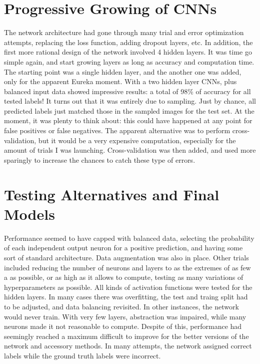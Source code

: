 \documentclass{article}
\begin{document}
\section{Progressive Growing of CNNs}
The network architecture had gone through many trial and error optimization attempts, replacing the loss function, adding dropout layers, etc.
In addition, the first more rational design of the network involved 4 hidden layers.
It was time go simple again, and start growing layers as long as accuracy and computation time.
The starting point was a single hidden layer, and the another one was added, only for the apparent Eureka moment.
With a two hidden layer CNNs, plus balanced input data showed impressive results: a total of 98\% of accuracy for all tested labels!
It turns out that it was entirely due to sampling.
Just by chance, all predicted labels just matched those in the sampled images for the test set.
At the moment, it was plenty to think about: this could have happened at any point for false positives or false negatives.
The apparent alternative was to perform cross-validation, but it would be a very expensive computation, especially for the amount of trials I was launching.
Cross-validation was then added, and used more sparingly to increase the chances to catch these type of errors.


\section{Testing Alternatives and Final Models}
Performance seemed to have capped with balanced data, selecting the probability of each independent output neuron for a positive prediction, and having some sort of standard architecture.
Data augmentation was also in place.
Other trials included reducing the number of neurons and layers to as the extremes of as few a as possible, or as high as it allows to compute, testing as many variations of hyperparameters as possible.
All kinds of activation functions were tested for the hidden layers.
In many cases there was overfitting, the test and traing split had to be adjusted, and data balancing revisited.
In other instances, the network would never train.
With very few layers, abstraction was impaired, while many neurons made it not reasonable to compute.
Despite of this, performance had seemingly reached a maximum difficult to improve for the better versions of the network and accessory methods.
In many attempts, the network assigned correct labels while the ground truth labels were incorrect.
\end{document}
